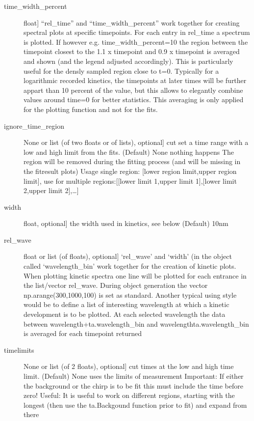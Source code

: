 \documentclass[letterpaper,10pt,english]{sphinxmanual}
\begin{document}
\begin{fulllineitems}
\begin{description}
\item[{time\_width\_percent}] \leavevmode{[}float{]}
“rel\_time” and “time\_width\_percent” work together for creating spectral plots at
specific timepoints. For each entry in rel\_time a spectrum is plotted.
If however e.g. time\_width\_percent=10 the region between the timepoint closest
to the  1.1 x timepoint and 0.9 x timepoint is averaged and shown
(and the legend adjusted accordingly). This is particularly useful for the densly
sampled region close to t=0. Typically for a logarithmic recorded kinetics, the
timepoints at later times will be further appart than 10 percent of the value,
but this allows to elegantly combine values around time=0 for better statistics.
This averaging is only applied for the plotting function and not for the fits.

\item[{ignore\_time\_region}] \leavevmode{[}None or list (of two floats or of lists), optional{]}
cut set a time range with a low and high limit from the fits. (Default) None nothing happens
The region will be removed during the fitting process (and will be missing in the fit\sphinxhyphen{}result
plots)
Usage single region: {[}lower region limit,upper region limit{]},
use for multiple regions:{[}{[}lower limit 1,upper limit 1{]},{[}lower limit 2,upper limit 2{]},…{]}

\item[{width}] \leavevmode{[}float, optional{]}
the width used in kinetics, see below (Default) 10nm

\item[{rel\_wave}] \leavevmode{[}float or list (of floats), optional{]}
‘rel\_wave’ and ‘width’ (in the object called ‘wavelength\_bin’ work together for the creation
of kinetic plots. When plotting kinetic spectra one line will be plotted for each entrance
in the list/vector rel\_wave. During object generation the vector np.arange(300,1000,100)
is set as standard. Another typical using style would be to define a list of interesting
wavelength at which a kinetic development is to be plotted. At each selected wavelength
the data between wavelength+ta.wavelength\_bin and wavelength\sphinxhyphen{}ta.wavelength\_bin is averaged
for each timepoint returned

\item[{timelimits}] \leavevmode{[}None or list (of 2 floats), optional{]}
cut times at the low and high time limit. (Default) None uses the limits of measurement
Important: If either the background or the chirp is to be fit this must include the
time before zero! Useful: It is useful to work on different regions, starting with
the longest (then use the ta.Backgound function prior to fit) and expand from there


\end{description}
\end{fulllineitems}
\end{document}
